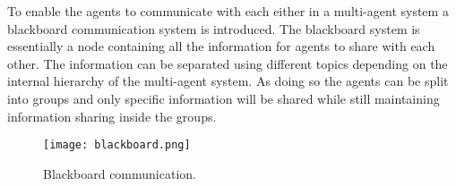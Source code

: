 
To enable the agents to communicate with each either in a multi-agent system a blackboard communication system is introduced. 
The blackboard system is essentially a node containing all the information for agents to share with each other. 
The information can be separated using different topics depending on the internal hierarchy of the multi-agent system. 
As doing so the agents can be split into groups and only specific information will be shared while still maintaining information sharing inside the groups.

\begin{figure}[ht]
    \centering
    \texttt{[image: blackboard.png]}
    \caption[Blackboard communication]{Blackboard communication\footnotemark.}
\end{figure}
